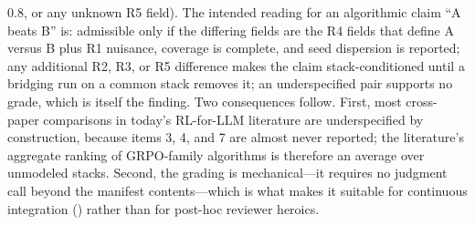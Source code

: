 $0.8$, or any unknown R5 field). The intended reading for an algorithmic claim
``A beats B'' is: admissible only if the differing fields are the R4 fields
that define A versus B plus R1 nuisance, coverage is complete, and seed
dispersion is reported; any additional R2, R3, or R5 difference makes the
claim stack-conditioned until a bridging run on a common stack removes it; an
underspecified pair supports no grade, which is itself the finding.
Two consequences follow. First, most cross-paper comparisons in today's
RL-for-LLM literature are underspecified by construction, because items 3, 4,
and 7 are almost never reported; the literature's aggregate ranking of
GRPO-family algorithms is therefore an average over unmodeled stacks. Second,
the grading is mechanical---it requires no judgment call beyond the manifest
contents---which is what makes it suitable for continuous integration
() rather than for post-hoc reviewer heroics.
